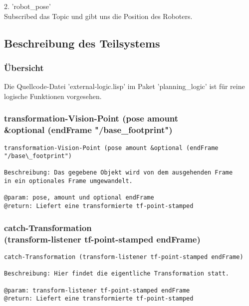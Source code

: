 \documentclass{suturo}
\begin{document}
2. 'robot\_pose' \\
Subscribed das Topic und gibt uns die Position des Roboters.
\subsection{Beschreibung des Teilsystems}

\subsubsection{\"Ubersicht}
Die Quellcode-Datei 'external-logic.lisp' im Paket 'planning\_logic' ist für reine logische Funktionen vorgesehen.



\subsubsection{transformation-Vision-Point (pose amount\\
\&optional (endFrame "/base\_footprint")}
\begin{verbatim}
transformation-Vision-Point (pose amount &optional (endFrame "/base\_footprint")

Beschreibung: Das gegebene Objekt wird von dem ausgehenden Frame
in ein optionales Frame umgewandelt.

@param: pose, amount und optional endFrame
@return: Liefert eine transformierte tf-point-stamped
\end{verbatim}




\subsubsection{catch-Transformation \\
(transform-listener tf-point-stamped endFrame)}
\begin{verbatim}
catch-Transformation (transform-listener tf-point-stamped endFrame)

Beschreibung: Hier findet die eigentliche Transformation statt.

@param: transform-listener tf-point-stamped endFrame
@return: Liefert eine transformierte tf-point-stamped
\end{verbatim}


\end{document}

